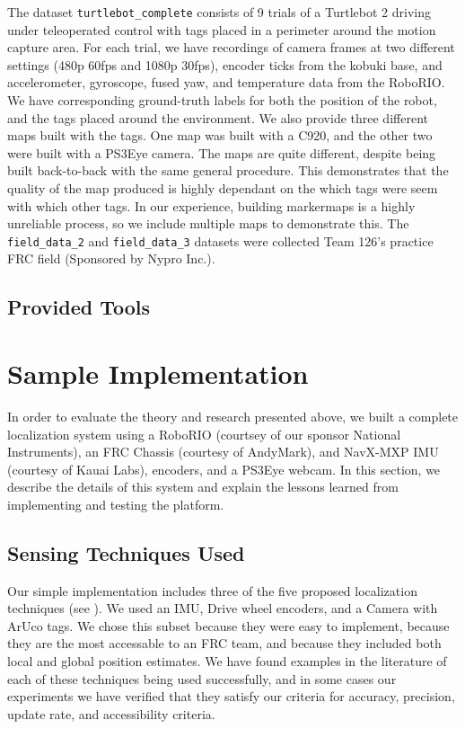 \documentclass{article}
\newcommand{\Newnameref}[1]{\textit{\nameref{#1}}}
\begin{document}
  The dataset \texttt{turtlebot\_complete} consists of 9 trials of a Turtlebot 2 driving under teleoperated control with tags placed in a perimeter around the motion capture area. For each trial, we have recordings of camera frames at two different settings (480p 60fps and 1080p 30fps), encoder ticks from the kobuki base, and accelerometer, gyroscope, fused yaw, and temperature data from the RoboRIO. We have corresponding ground-truth labels for both the position of the robot, and the tags placed around the environment. We also provide three different maps built with the tags. One map was built with a C920, and the other two were built with a PS3Eye camera. The maps are quite different, despite being built back-to-back with the same general procedure. This demonstrates that the quality of the map produced is highly dependant on the which tags were seem with which other tags. In our experience, building markermaps is a highly unreliable process, so we include multiple maps to demonstrate this.
  The \texttt{field\_data\_2} and \texttt{field\_data\_3} datasets were collected Team 126's practice FRC field (Sponsored by Nypro Inc.).

  \subsection{Provided Tools} \label{section:tools}




\section{Sample Implementation} \label{section:specs}

  In order to evaluate the theory and research presented above, we built a complete localization system using a RoboRIO (courtsey of our sponsor National Instruments), an FRC Chassis (courtesy of AndyMark), and NavX-MXP IMU (courtesy of Kauai Labs), encoders, and a PS3Eye webcam. In this section, we describe the details of this system and explain the lessons learned from implementing and testing the platform.

  \subsection{Sensing Techniques Used}\label{section:techniques_used}

    Our simple implementation includes three of the five proposed localization techniques (see \Newnameref{section:proposed_techniques}). We used an IMU, Drive wheel encoders, and a Camera with ArUco tags. We chose this subset because they were easy to implement, because they are the most accessable to an FRC team, and because they included both local and global position estimates. We have found examples in the literature of each of these techniques being used successfully, and in some cases our experiments we have verified that they satisfy our criteria for accuracy, precision, update rate, and accessibility criteria.
\end{document}
